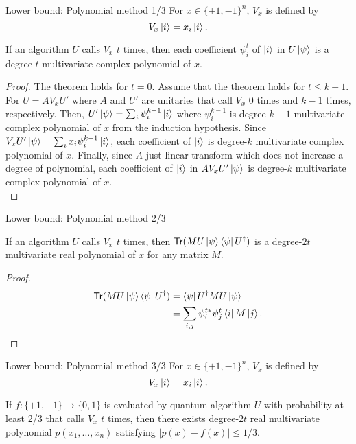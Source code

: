 \documentclass{beamer}
\newcommand{\Tr}{\mathsf{Tr}}
\newcommand\emm[1]{\textcolor{redorange}{{#1}}}
\begin{document}
\begin{frame}{Lower bound: Polynomial method 1/3}
For $x\in\{+1,-1\}^n$, $V_x$ is defined by
\begin{equation*}
V_x \ket{i} = x_i \ket{i}.
\end{equation*}
\begin{theorem}
If an algorithm $U$ calls $V_x$ $t$ times, then each coefficient $\psi^t_i$ of $\ket{i}$ in $U\ket{\psi}$ is a \emm{degree-$t$ multivariate complex polynomial} of $x$.
\end{theorem}
\begin{proof}
The theorem holds for $t=0$. Assume that the theorem holds for $t\le k-1$.
For $U=A V_x U'$ where $A$ and $U'$ are unitaries that call $V_x$ 0 times and $k-1$ times, respectively.
Then, $U'\ket{\psi}=\sum_i \psi_i^{k-1}\ket{i}$ where $\psi_i^{k-1}$ is degree $k-1$ multivariate complex polynomial of $x$ from the induction hypothesis.
Since $V_xU'\ket{\psi}=\sum_i x_i\psi_i^{k-1}\ket{i}$, each coefficient of $\ket{i}$ is degree-$k$ multivariate complex polynomial of $x$.
Finally, since $A$ just linear transform which does not increase a degree of polynomial, each coefficient of $\ket{i}$ in $AV_xU'\ket{\psi}$ is degree-$k$ multivariate complex polynomial of $x$.
\begin{equation*}
\end{equation*}
\end{proof}
\end{frame}

\begin{frame}{Lower bound: Polynomial method 2/3}
\begin{corollary}
If an algorithm $U$ calls $V_x$ $t$ times, then $\Tr(M U\ket{\psi}\bra{\psi}U^\dagger)$ is a \emm{degree-$2t$ multivariate real polynomial} of $x$ for any matrix $M$.
\end{corollary}
\begin{proof}
\begin{align*}
\Tr(M U\ket{\psi}\bra{\psi}U^\dagger)
&= \bra{\psi}U^\dagger M U\ket{\psi}\\
&= \sum_{i,j} \psi_i^{t*} \psi_j^t \bra{i}M\ket{j}.
\end{align*}
\end{proof}
\end{frame}

\begin{frame}{Lower bound: Polynomial method 3/3}
For $x\in\{+1,-1\}^n$, $V_x$ is defined by
\begin{equation*}
V_x \ket{i} = x_i \ket{i}.
\end{equation*}
\begin{theorem}
If $f:\{+1,-1\}\to\{0,1\}$ is evaluated by quantum algorithm $U$ with probability at least 2/3 that calls $V_x$ $t$ times,
then there exists degree-$2t$ real multivariate polynomial $p(x_1,\dotsc,x_n)$ satisfying \emm{$|p(x) - f(x)| \le 1/3$}.
\end{theorem}
\end{frame}
\end{document}
